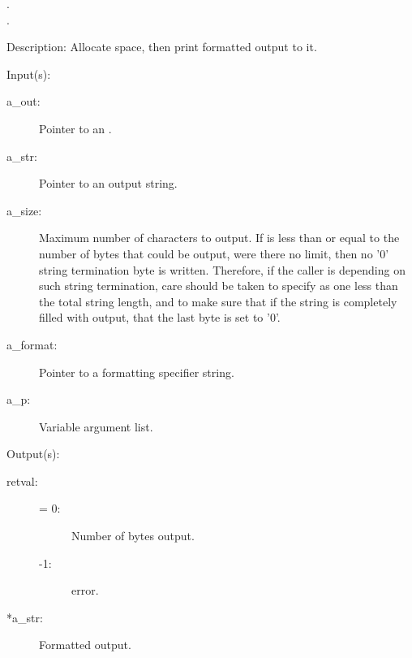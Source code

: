 \begin{capi}
\begin{capilist}
		\begin{description}\item[]
		\item[.]
		\item[.]
		\end{description}
	\item[Description: ]
		Allocate space, then print formatted output to it.
	\end{capilist}
\label{out_put_svn}
	\begin{capilist}
	\item[Input(s): ]
		\begin{description}\item[]
		\item[a\_out: ]
			Pointer to an .
		\item[a\_str: ]
			Pointer to an output string.
		\item[a\_size: ]
			Maximum number of characters to output.  If
			 is less than or equal to the number of
			bytes that could be output, were there no limit, then no
			'{\bs}0' string termination byte is written.  Therefore,
			if the caller is depending on such string termination,
			care should be taken to specify  as one
			less than the total string length, and to make sure that
			if the string is completely filled with output, that the
			last byte is set to '{\bs}0'.
		\item[a\_format: ]
			Pointer to a formatting specifier string.
		\item[a\_p: ]
			Variable argument list.
		\end{description}
	\item[Output(s): ]
		\begin{description}\item[]
		\item[retval: ]
			\begin{description}\item[]
			\item[{\gt}= 0: ]
				Number of bytes output.
			\item[-1: ]
				 error.
			\end{description}
		\item[*a\_str: ]
			Formatted output.

\end{description}
\end{capilist}
\end{capi}
